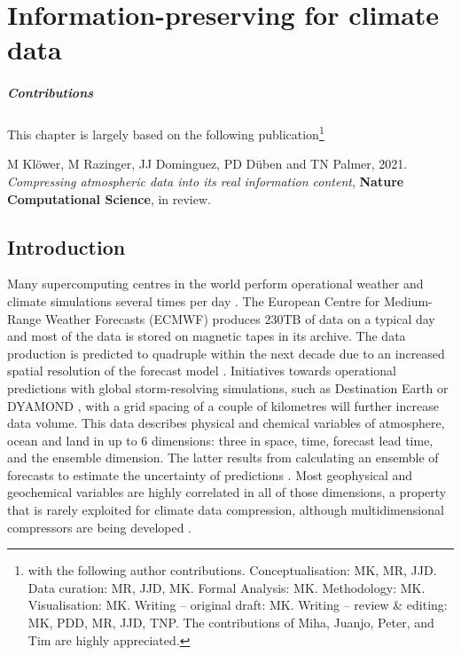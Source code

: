 \chapter{Information-preserving  for climate data}
\label{chap:compression}

{\small
\paragraph{Contributions} This chapter is largely based on the following publication\footnote{with the following author contributions.
Conceptualisation: MK, MR, JJD. Data curation: MR, JJD, MK. Formal Analysis: MK. Methodology: MK. Visualisation: MK. Writing –
original draft: MK. Writing – review \& editing: MK, PDD, MR, JJD, TNP. The contributions of Miha, Juanjo, Peter, and Tim are highly
appreciated.}

\vspace{\baselineskip}
\indent M Klöwer, M Razinger, JJ Dominguez, PD Düben and TN Palmer, 2021. \emph{Compressing atmospheric data into its real
information content}, \textbf{Nature Computational Science}, in review.
\vspace{\baselineskip}}

\section{Introduction}
\label{sec:compression_introduction}

Many supercomputing centres in the world perform operational weather and climate simulations several times per day \citep{Bauer2015}.
The European Centre for Medium-Range Weather Forecasts (ECMWF) produces 230TB of data on a typical day and
most of the data is stored on magnetic tapes in its archive. The data production is predicted to quadruple within the
next decade due to an increased spatial resolution of the forecast model \citep{Bauer2020,Voosen2020,Schar2020}.
Initiatives towards operational predictions with global storm-resolving simulations, such as Destination Earth
\citep{Bauer2021,Bauer2021a} or DYAMOND \citep{Stevens2019}, with a grid spacing of a couple of
kilometres will further increase data volume. This data describes physical and chemical variables of atmosphere, ocean
and land in up to 6 dimensions: three in space, time, forecast lead time, and the ensemble dimension. The latter results
from calculating an ensemble of forecasts to estimate the uncertainty of predictions \citep{Molteni1996,Palmer2019}.
Most geophysical and geochemical variables are highly correlated in all of those dimensions, a property that is rarely
exploited for climate data compression, although multidimensional compressors are being developed
\citep{Ballester-Ripoll2020,Lindstrom2014,vonLarcher2019,Zhao2020,Di2016}.

